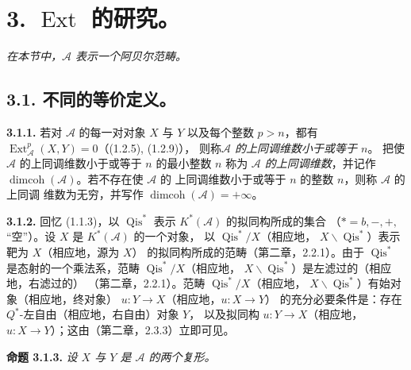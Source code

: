 \clearpage
{}%
\begingroup\small\setlength{\parskip}{0pt}\setlength{\emergencystretch}{1.5em}
\setlength{\abovedisplayskip}{4pt plus 2pt minus 2pt}%
\setlength{\belowdisplayskip}{4pt plus 2pt minus 2pt}%

\section*{3. \texorpdfstring{$\operatorname{Ext}$}{Ext} 的研究。}

\noindent\textit{在本节中，$\mathcal A$ 表示一个阿贝尔范畴。}

\subsection*{3.1. 不同的等价定义。}

\noindent\textbf{3.1.1.}\quad
若对 $\mathcal A$ 的每一对对象 $X$ 与 $Y$ 以及每个整数 $p>n$，都有
$\operatorname{Ext}_{\mathcal A}^{p}(X,Y)=0$（(1.2.5), (1.2.9)），
则称\emph{$\mathcal A$ 的上同调维数小于或等于 $n$}。
把使 $\mathcal A$ 的上同调维数小于或等于 $n$ 的最小整数 $n$ 称为
\emph{$\mathcal A$ 的上同调维数}，并记作
$\operatorname{dimcoh}(\mathcal A)$。若不存在使 $\mathcal A$ 的
上同调维数小于或等于 $n$ 的整数 $n$，则称 $\mathcal A$ 的上同调
维数为无穷，并写作
$\operatorname{dimcoh}(\mathcal A)=+\infty$。

\noindent\textbf{3.1.2.}\quad
回忆 (1.1.3)，以 $\operatorname{Qis}^{*}$ 表示
$K^{*}(\mathcal A)$ 的拟同构所成的集合
（$*=b,-,+,{}$“空”）。设 $X$ 是 $K^{*}(\mathcal A)$ 的一个对象，
以 $\operatorname{Qis}^{*}/X$（相应地，
$X\backslash\operatorname{Qis}^{*}$）表示靶为 $X$（相应地，源为 $X$）
的拟同构所成的范畴（第二章，2.2.1）。由于
$\operatorname{Qis}^{*}$ 是态射的一个乘法系，范畴
$\operatorname{Qis}^{*}/X$（相应地，
$X\backslash\operatorname{Qis}^{*}$）是左滤过的（相应地，右滤过的）
（第二章，2.2.1）。范畴 $\operatorname{Qis}^{*}/X$（相应地，
$X\backslash\operatorname{Qis}^{*}$）有始对象（相应地，终对象）
$u\colon Y\longrightarrow X$（相应地，$u\colon X\longrightarrow Y$）
的充分必要条件是：存在 $Q^{*}$-左自由（相应地，右自由）对象 $Y$，
以及拟同构 $u\colon Y\longrightarrow X$（相应地，
$u\colon X\longrightarrow Y$）；这由（第二章，2.3.3）立即可见。

\medskip\noindent\textbf{命题 3.1.3.}\quad
\textit{设 $X$ 与 $Y$ 是 $\mathcal A$ 的两个复形。}

